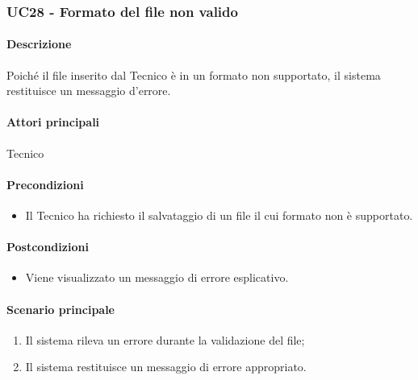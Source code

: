 \subsubsection{UC28 - Formato del file non valido}\label{UC28}
\paragraph*{Descrizione}
Poiché il file inserito dal Tecnico è in un formato non supportato, il sistema restituisce un messaggio d'errore.

\paragraph*{Attori principali}
Tecnico

\paragraph*{Precondizioni}
\begin{itemize}
  \item Il Tecnico ha richiesto il salvataggio di un file il cui formato non è supportato.
\end{itemize}

\paragraph*{Postcondizioni}
\begin{itemize}
  \item Viene visualizzato un messaggio di errore esplicativo.
\end{itemize}

\paragraph*{Scenario principale}
\begin{enumerate}
  \item Il sistema rileva un errore durante la validazione del file;
  \item Il sistema restituisce un messaggio di errore appropriato.
\end{enumerate}
